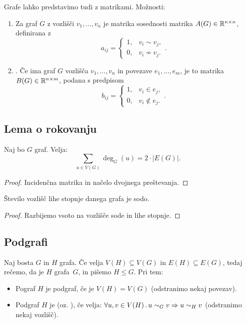 \begin{primer}
    Grafe lahko predstavimo tudi z matrikami. Možnosti:
    \begin{enumerate}
        \item {} Za graf $G$ z vozlišči $v_1, \ldots, v_n$ je matrika sosednosti matrika $A(G) \in \mathbb{R}^{n \times n}$, definirana z $$a_{ij} = \begin{cases}
            1, &v_i \sim v_j, \\
            0, &v_i \nsim v_j.
        \end{cases}.$$
        \item {}. Če ima graf $G$  vozlišča $v_1, \ldots, v_n$ in povezave $e_1, \ldots, e_m$, je to matrika $B(G) \in \mathbb{R}^{n \times m}$, podana s predpisom $$b_{ij} = \begin{cases}
            1, &v_i \in e_j, \\
            0, &v_i \notin e_j.
        \end{cases}.$$
    \end{enumerate}
\end{primer}

\subsection{Lema o rokovanju}
\begin{lema}[o rokovanju]
    Naj bo $G$ graf. Velja: $$\sum_{u \in V(G)} \deg_G(u) = 2 \cdot |E(G)|.$$
\end{lema}

\begin{proof}
    Incidenčna matrika in načelo dvojnega preštevanja.
\end{proof}

\begin{posledica}
    Število vozlišč lihe stopnje danega grafa je sodo.
\end{posledica}

\begin{proof}
    Razbijemo vsoto na vozlišče sode in lihe stopnje.
\end{proof}

\subsection{Podgrafi}
\begin{definicija}
    Naj bosta $G$ in $H$ grafa. Če velja $V(H) \subseteq V(G)$ in $E(H) \subseteq E(G)$, tedaj rečemo, da je $H$  grafa~$G$, in pišemo $H \leq G$. Pri tem:
    \begin{itemize}
        \item Pograf $H$ je  podgraf, če je $V(H) = V(G)$ (odstranimo nekaj povezav).
        \item Podgraf $H$ je  (oz. ), če velja:  $\forall u, v \in V(H) \,.\, u \sim_G v \Rightarrow u \sim_H v$ (odstranimo nekaj vozlišč).
    \end{itemize}
\end{definicija}
